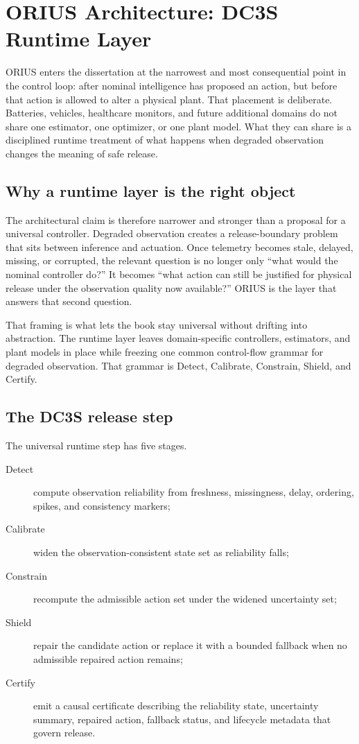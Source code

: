\chapter{ORIUS Architecture: DC3S Runtime Layer}
\label{ch:orius-architecture-dc3s}

ORIUS enters the dissertation at the narrowest and most consequential point in the control
loop: after nominal intelligence has proposed an action, but before that action is allowed
to alter a physical plant. That placement is deliberate. Batteries, vehicles, healthcare
monitors, and future additional domains do not share one estimator, one optimizer, or one
plant model. What they can share is a disciplined runtime treatment of what happens when
degraded observation changes the meaning of safe release.

\section{Why a runtime layer is the right object}
The architectural claim is therefore narrower and stronger than a proposal for a universal
controller. Degraded observation creates a release-boundary problem that sits between
inference and actuation. Once telemetry becomes stale, delayed, missing, or corrupted, the
relevant question is no longer only ``what would the nominal controller do?'' It becomes
``what action can still be justified for physical release under the observation quality now
available?'' ORIUS is the layer that answers that second question.

That framing is what lets the book stay universal without drifting into abstraction. The
runtime layer leaves domain-specific controllers, estimators, and plant models in place
while freezing one common control-flow grammar for degraded observation. That grammar is
Detect, Calibrate, Constrain, Shield, and Certify.

\section{The DC3S release step}
The universal runtime step has five stages.
\begin{description}
  \item[Detect] compute observation reliability from freshness, missingness, delay,
  ordering, spikes, and consistency markers;
  \item[Calibrate] widen the observation-consistent state set as reliability falls;
  \item[Constrain] recompute the admissible action set under the widened uncertainty set;
  \item[Shield] repair the candidate action or replace it with a bounded fallback when no
  admissible repaired action remains;
  \item[Certify] emit a causal certificate describing the reliability state, uncertainty
  summary, repaired action, fallback status, and lifecycle metadata that govern release.
\end{description}

